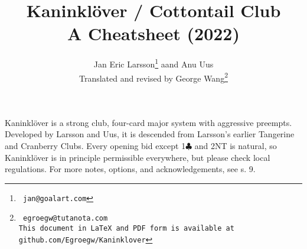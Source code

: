 \documentclass[a4paper, twoside, 11pt]{article}
\title{\vspace{-0.5in}Kaninklöver / Cottontail Club\\A Cheatsheet (2022)}
\author{
Jan Eric Larsson\footnote{\normalsize{\texttt{ jan@goalart.com}}} \hphantom aand Anu Uus \\
Translated and revised by George Wang\footnote{\normalsize{\texttt{ egroegw@tutanota.com \\
This document  in LaTeX and PDF form is available at github.com/Egroegw/Kaninklover}}}
}
\date{}
\begin{document}
\maketitle

\itshape

\vspace{-0.5cm}\begin{adjustwidth}{65pt}{65pt}
Kaninklöver is a strong club, four-card major system with aggressive preempts. Developed by Larsson and Uus, it is descended from Larsson's earlier Tangerine and Cranberry Clubs. Every opening bid except 1$\clubsuit$ and 2NT is natural, so Kaninklöver is in principle permissible everywhere, but please check local regulations. For more notes, options, and acknowledgements, see s. 9.
\end{adjustwidth}
\end{document}

